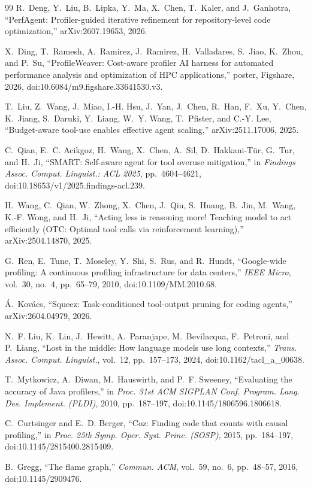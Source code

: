 \documentclass[conference]{IEEEtran}
\begin{document}
\begin{thebibliography}{99}
R.~Deng, Y.~Liu, B.~Lipka, Y.~Ma, X.~Chen, T.~Kaler, and J.~Ganhotra,
``{PerfAgent}: Profiler-guided iterative refinement for repository-level code optimization,''
arXiv:2607.19653, 2026.

X.~Ding, T.~Ramesh, A.~Ramirez, J.~Ramirez, H.~Valladares, S.~Jiao, K.~Zhou, and P.~Su,
``{ProfileWeaver}: Cost-aware profiler {AI} harness for automated performance analysis and optimization of {HPC} applications,''
poster, Figshare, 2026, doi:10.6084/m9.figshare.33641530.v3.

T.~Liu, Z.~Wang, J.~Miao, I.-H. Hsu, J.~Yan, J.~Chen, R.~Han, F.~Xu, Y.~Chen, K.~Jiang, S.~Daruki, Y.~Liang, W.~Y. Wang, T.~Pfister, and C.-Y. Lee,
``Budget-aware tool-use enables effective agent scaling,''
arXiv:2511.17006, 2025.

C.~Qian, E.~C. Acikgoz, H.~Wang, X.~Chen, A.~Sil, D.~Hakkani-T\"ur, G.~Tur, and H.~Ji,
``{SMART}: Self-aware agent for tool overuse mitigation,''
in \emph{Findings Assoc. Comput. Linguist.: ACL 2025}, pp.~4604--4621,
doi:10.18653/v1/2025.findings-acl.239.

H.~Wang, C.~Qian, W.~Zhong, X.~Chen, J.~Qiu, S.~Huang, B.~Jin, M.~Wang, K.-F. Wong, and H.~Ji,
``Acting less is reasoning more! {T}eaching model to act efficiently ({OTC}: Optimal tool calls via reinforcement learning),''
arXiv:2504.14870, 2025.

G.~Ren, E.~Tune, T.~Moseley, Y.~Shi, S.~Rus, and R.~Hundt,
``Google-wide profiling: A continuous profiling infrastructure for data centers,''
\emph{IEEE Micro}, vol.~30, no.~4, pp.~65--79, 2010, doi:10.1109/MM.2010.68.

\'A.~Kov\'acs,
``Squeez: Task-conditioned tool-output pruning for coding agents,''
arXiv:2604.04979, 2026.

N.~F. Liu, K.~Lin, J.~Hewitt, A.~Paranjape, M.~Bevilacqua, F.~Petroni, and P.~Liang,
``Lost in the middle: How language models use long contexts,''
\emph{Trans. Assoc. Comput. Linguist.}, vol.~12, pp.~157--173, 2024,
doi:10.1162/tacl\_a\_00638.

T.~Mytkowicz, A.~Diwan, M.~Hauswirth, and P.~F. Sweeney,
``Evaluating the accuracy of {Java} profilers,''
in \emph{Proc. 31st ACM SIGPLAN Conf. Program. Lang. Des. Implement. (PLDI)}, 2010, pp.~187--197,
doi:10.1145/1806596.1806618.

C.~Curtsinger and E.~D. Berger,
``Coz: Finding code that counts with causal profiling,''
in \emph{Proc. 25th Symp. Oper. Syst. Princ. (SOSP)}, 2015, pp.~184--197,
doi:10.1145/2815400.2815409.

B.~Gregg,
``The flame graph,''
\emph{Commun. ACM}, vol.~59, no.~6, pp.~48--57, 2016,
doi:10.1145/2909476.

\end{thebibliography}
\end{document}
